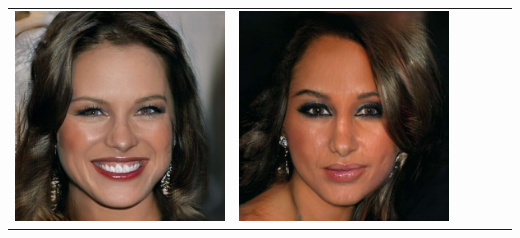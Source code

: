 \documentclass[a0,landscape]{a0poster}
\begin{document}
\begin{multicols}{3}
\begin{center}
\begin{tabular}{cc|cc|cc}
\includegraphics[width=\pganw]{../figures/pgan/54_base_iso_base.jpg} &
\includegraphics[width=\pganw]{../figures/pgan/55_base_iso_base.jpg} &

\end{tabular}
\end{center}
\end{multicols}
\end{document}
